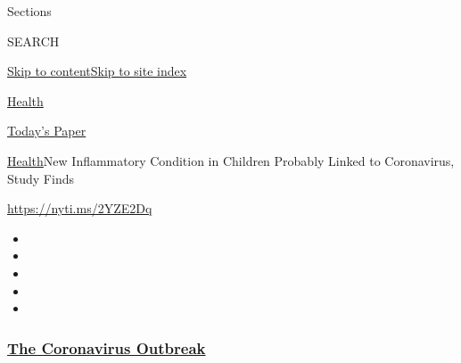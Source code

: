 Sections

SEARCH

\protect\hyperlink{site-content}{Skip to
content}\protect\hyperlink{site-index}{Skip to site index}

\href{https://www.nytimes3xbfgragh.onion/section/health}{Health}

\href{https://myaccount.nytimes3xbfgragh.onion/auth/login?response_type=cookie\&client_id=vi}{}

\href{https://www.nytimes3xbfgragh.onion/section/todayspaper}{Today's
Paper}

\href{/section/health}{Health}\textbar{}New Inflammatory Condition in
Children Probably Linked to Coronavirus, Study Finds

\url{https://nyti.ms/2YZE2Dq}

\begin{itemize}
\item
\item
\item
\item
\item
\end{itemize}

\hypertarget{the-coronavirus-outbreak}{%
\subsubsection{\texorpdfstring{\href{https://www.nytimes3xbfgragh.onion/news-event/coronavirus?name=styln-coronavirus-national\&region=TOP_BANNER\&block=storyline_menu_recirc\&action=click\&pgtype=Article\&impression_id=834d6670-f1d4-11ea-a677-9d581f459086\&variant=undefined}{The
Coronavirus
Outbreak}}{The Coronavirus Outbreak}}\label{the-coronavirus-outbreak}}

